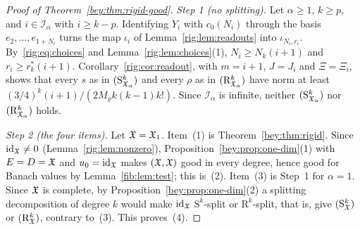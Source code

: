\begin{proof}[Proof of Theorem~\textup{\ref{bey:thm:rigid-good}}]
\emph{Step 1 (no splitting).} Let $\alpha\ge1$, $k\ge p$, and $i\in\mathcal I_\alpha$ with $i\ge k-p$. Identifying $Y_i$
with $c_0(N_i)$ through the basis $e_2,\dots,e_{1+N_i}$ turns the map $\iota_i$ of Lemma~\ref{rig:lem:readouts} into
$\iota_{N_i,r_i}$. By~\eqref{rig:eq:choices} and Lemma~\ref{rig:lem:choices}(1), $N_i\ge N_k(i+1)$ and
$r_i\ge r^*_k(i+1)$. Corollary~\ref{rig:cor:readout}, with $m=i+1$, $J=J_i$ and $\Xi=\Xi_i$, shows that every $s$ as in
$(\mathrm S^k_{\mathfrak X_\alpha})$ and every $\rho$ as in $(\mathrm R^k_{\mathfrak X_\alpha})$ have norm at least
$(3/4)^k(i+1)/(2M_\varrho k(k-1)k!)$. Since $\mathcal I_\alpha$ is infinite, neither $(\mathrm S^k_{\mathfrak X_\alpha})$ nor
$(\mathrm R^k_{\mathfrak X_\alpha})$ holds.

\emph{Step 2 (the four items).} Let $\mathfrak X=\mathfrak X_1$. Item~(1) is Theorem~\ref{bey:thm:rigid}. Since $\mathrm{id}_\mathfrak X\ne0$
(Lemma~\ref{rig:lem:nonzero}), Proposition~\ref{bey:prop:one-dim}(1) with $E=D=\mathfrak X$ and $u_0=\mathrm{id}_\mathfrak X$ makes $(\mathfrak X,\mathfrak X)$
good in every degree, hence good for Banach values by Lemma~\ref{fib:lem:test}; this is~(2). Item~(3) is Step~1 for
$\alpha=1$. Since $\mathfrak X$ is complete, by Proposition~\ref{bey:prop:one-dim}(2) a splitting decomposition of degree $k$
would make $\mathrm{id}_\mathfrak X$ $\mathrm S^k$-split or $\mathrm R^k$-split, that is, give $(\mathrm S^k_\mathfrak X)$ or
$(\mathrm R^k_\mathfrak X)$, contrary to~(3). This proves~(4).
\end{proof}

